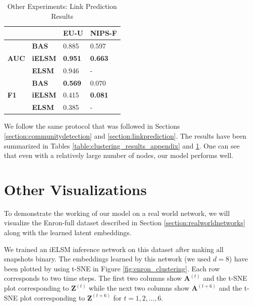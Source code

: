 \documentclass[letterpaper]{article} %
\begin{document}
\begin{table}[t]
\caption{Other Experiments: Link Prediction Results}
\label{table:linkpredictionresults_appendix}
\vskip 0.1in
\begin{center}
\begin{small}
\begin{sc}
\begin{tabular}{p{1.3cm}lp{1.5cm}p{1.5cm}}
\toprule
& & \textbf{EU-U}& \textbf{NIPS-F} \\
\midrule
\multirow{3}{*}{\textbf{AUC}}& \textbf{BAS} & 0.885 & 0.597 \\
& \textbf{iELSM} & \textbf{0.951} & \textbf{0.663} \\
& \textbf{ELSM} & 0.946 & - \\
\hline
\multirow{3}{*}{\textbf{F1}}& \textbf{BAS} & \textbf{0.569} & 0.070 \\
& \textbf{iELSM} & 0.415 & \textbf{0.081} \\
& \textbf{ELSM} & 0.385 & - \\
\bottomrule
\end{tabular}
\end{sc}
\end{small}
\end{center}
\vskip -0.1in
\end{table}

We follow the same protocol that was followed in Sections \ref{section:communitydetection} and \ref{section:linkprediction}. The results have been summarized in Tables \ref{table:clustering_results_appendix} and \ref{table:linkpredictionresults_appendix}. One can see that even with a relatively large number of nodes, our model performs well.
\fi
 



\section{Other Visualizations}
\label{appendix:othervisualizations}
To demonstrate the working of our model on a real world network, we will visualize the Enron-full dataset described in Section \ref{section:realworldnetworks} along with the learned latent embeddings. 

We trained an iELSM inference network on this dataset after making all snapshots binary. The embeddings learned by this network (we used $d=8$) have been plotted by using t-SNE \cite{Maaten:2008:VisualizingDataUsingTSNE} in Figure \ref{fig:enron_clustering}. Each row corresponds to two time steps. The first two columns show $\mathbf{A}^{(t)}$ and the t-SNE plot corresponding to $\mathbf{Z}^{(t)}$ while the next two columns show $\mathbf{A}^{(t+6)}$ and the t-SNE plot corresponding to $\mathbf{Z}^{(t+6)}$ for $t = 1, 2, ..., 6$.
\end{document}
